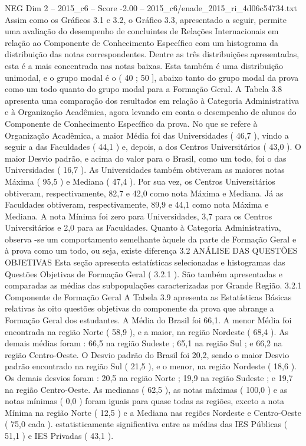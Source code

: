 \begin{textsample}{NEG Dim 2 – 2015\_c6 – Score -2.00 – 2015\_c6/enade\_2015\_ri\_4d06c54734.txt}
Assim como os Gráficos 3.1 e 3.2, o Gráfico 3.3, apresentado a seguir, permite uma avaliação do desempenho de concluintes de Relações Internacionais em relação ao Componente de Conhecimento Específico com um histograma da distribuição das notas correspondentes.
Dentre as três distribuições apresentadas, esta é a mais concentrada nas notas baixas.
Esta também é uma distribuição unimodal, e o grupo modal é o ( 40 ; 50 ], abaixo tanto do grupo modal da prova como um todo quanto do grupo modal para a Formação Geral.
A Tabela 3.8 apresenta uma comparação dos resultados em relação à Categoria Administrativa e à Organização Acadêmica, agora levando em conta o desempenho de alunos do Componente de Conhecimento Específico da prova.
No que se refere à Organização Acadêmica, a maior Média foi das Universidades ( 46,7 ), vindo a seguir a das Faculdades ( 44,1 ) e, depois, a dos Centros Universitários ( 43,0 ).
O maior Desvio padrão, e acima do valor para o Brasil, como um todo, foi o das Universidades ( 16,7 ).
As Universidades também obtiveram as maiores notas Máxima ( 95,5 ) e Mediana ( 47,4 ).
Por sua vez, os Centros Universitários obtiveram, respectivamente, 82,7 e 42,0 como nota Máxima e Mediana.
Já as Faculdades obtiveram, respectivamente, 89,9 e 44,1 como nota Máxima e Mediana.
A nota Mínima foi zero para Universidades, 3,7 para os Centros Universitários e 2,0 para as Faculdades.
Quanto à Categoria Administrativa, observa -se um comportamento semelhante àquele da parte de Formação Geral e à prova como um todo, ou seja, existe diferença 3.2 ANÁLISE DAS QUESTÕES OBJETIVAS Esta seção apresenta estatísticas selecionadas e histogramas das Questões Objetivas de Formação Geral ( 3.2.1 ).
São também apresentadas e comparadas as médias das subpopulações caracterizadas por Grande Região. 3.2.1 Componente de Formação Geral A Tabela 3.9 apresenta as Estatísticas Básicas relativas às oito questões objetivas do componente da prova que abrange a Formação Geral dos estudantes.
A Média do Brasil foi 66,1.
A menor Média foi encontrada na região Norte ( 58,9 ), e a maior, na região Nordeste ( 68,4 ).
As demais médias foram : 66,5 na região Sudeste ; 65,1 na região Sul ; e 66,2 na região Centro-Oeste.
O Desvio padrão do Brasil foi 20,2, sendo o maior Desvio padrão encontrado na região Sul ( 21,5 ), e o menor, na região Nordeste ( 18,6 ).
Os demais desvios foram : 20,5 na região Norte ; 19,9 na região Sudeste ; e 19,7 na região Centro-Oeste.
As medianas ( 62,5 ), as notas máximas ( 100,0 ) e as notas mínimas ( 0,0 ) foram iguais para quase todas as regiões, exceto a nota Mínima na região Norte ( 12,5 ) e a Mediana nas regiões Nordeste e Centro-Oeste ( 75,0 cada ). estatisticamente significativa entre as médias das IES Públicas ( 51,1 ) e IES Privadas ( 43,1 ).

\end{textsample}
